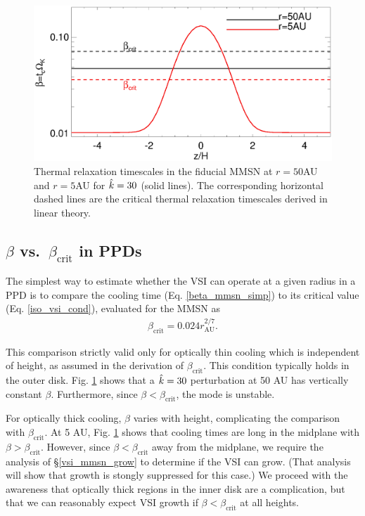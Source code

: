 \begin{figure}
  \includegraphics[width=\linewidth,clip=true,trim=0cm 0cm 0cm
  0cm]{figures/beta_compare}
  \caption{Thermal relaxation timescales in the fiducial MMSN at $r=50$AU
    and $r=5$AU for $\hat{k}=30$ (solid lines). The
    corresponding horizontal dashed lines are the critical thermal
    relaxation timescales derived in linear theory. 
    \label{beta_compare}}
\end{figure}


\subsection{$\beta$ vs.\ $\beta_\mathrm{crit}$ in PPDs}\label{bcritPPD} 
The simplest way to estimate whether the VSI can operate at a given radius in a PPD is to 
compare the cooling time (Eq. \ref{beta_mmsn_simp}) to 
its critical value (Eq. \ref{iso_vsi_cond}), evaluated for the MMSN as    
\begin{align}\label{bcrit_mmsn}
  \beta_\mathrm{crit} = 0.024r_\mathrm{AU}^{2/7}. 
\end{align}

This comparison strictly valid only for optically thin cooling which is independent of height,
as assumed in the derivation of $\beta_\mathrm{crit}$.  This condition typically holds in the outer disk.  
Fig. \ref{beta_compare} shows that a  $\hat{k}=30$ perturbation at 50 AU has vertically constant $\beta$. 
 Furthermore, since $\beta < \beta_\mathrm{crit}$, the mode is unstable.
 
For optically thick cooling, $\beta$ varies with height, complicating the comparison with $\beta_\mathrm{crit}$.   
At 5 AU, Fig. \ref{beta_compare} shows that cooling times are long in the midplane with $\beta > \beta_\mathrm{crit}$.
However, since $\beta < \beta_\mathrm{crit}$ away from the midplane, we require the analysis of \S\ref{vsi_mmsn_grow} to determine if the VSI can grow.  (That analysis will show that growth is stongly suppressed for this case.)  We proceed with the awareness that optically thick regions in the inner disk are a complication, but that we can reasonably expect VSI growth if $\beta < \beta_\mathrm{crit}$ at all heights.


